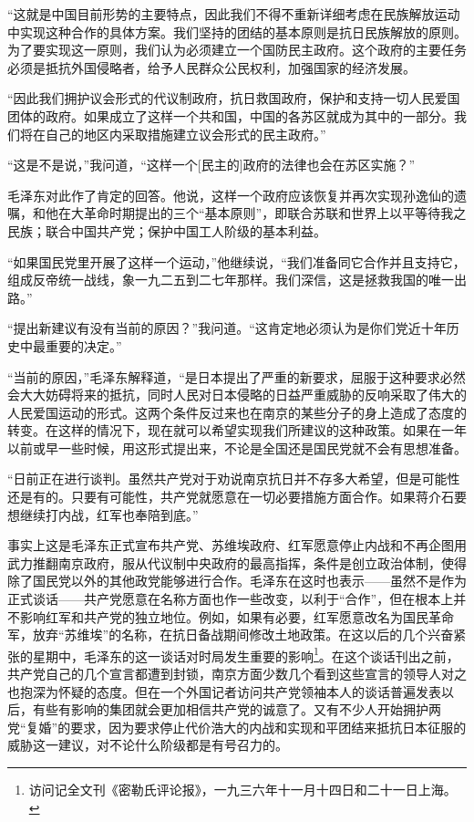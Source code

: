 \documentclass[10pt]{book}
\begin{document}
“这就是中国目前形势的主要特点，因此我们不得不重新详细考虑在民族解放运动中实现这种合作的具体方案。我们坚持的团结的基本原则是抗日民族解放的原则。为了要实现这一原则，我们认为必须建立一个国防民主政府。这个政府的主要任务必须是抵抗外国侵略者，给予人民群众公民权利，加强国家的经济发展。

“因此我们拥护议会形式的代议制政府，抗日救国政府，保护和支持一切人民爱国团体的政府。如果成立了这样一个共和国，中国的各苏区就成为其中的一部分。我们将在自己的地区内采取措施建立议会形式的民主政府。”

“这是不是说，”我问道，“这样一个[民主的]政府的法律也会在苏区实施？”

毛泽东对此作了肯定的回答。他说，这样一个政府应该恢复并再次实现孙逸仙的遗嘱，和他在大革命时期提出的三个“基本原则”，即联合苏联和世界上以平等待我之民族；联合中国共产党；保护中国工人阶级的基本利益。

“如果国民党里开展了这样一个运动，”他继续说，“我们准备同它合作并且支持它，组成反帝统一战线，象一九二五到二七年那样。我们深信，这是拯救我国的唯一出路。”

“提出新建议有没有当前的原因？”我问道。“这肯定地必须认为是你们党近十年历史中最重要的决定。”

“当前的原因，”毛泽东解释道，“是日本提出了严重的新要求，屈服于这种要求必然会大大妨碍将来的抵抗，同时人民对日本侵略的日益严重威胁的反响采取了伟大的人民爱国运动的形式。这两个条件反过来也在南京的某些分子的身上造成了态度的转变。在这样的情况下，现在就可以希望实现我们所建议的这种政策。如果在一年以前或早一些时候，用这形式提出来，不论是全国还是国民党就不会有思想准备。

“日前正在进行谈判。虽然共产党对于劝说南京抗日并不存多大希望，但是可能性还是有的。只要有可能性，共产党就愿意在一切必要措施方面合作。如果蒋介石要想继续打内战，红军也奉陪到底。”

事实上这是毛泽东正式宣布共产党、苏维埃政府、红军愿意停止内战和不再企图用武力推翻南京政府，服从代议制中央政府的最高指挥，条件是创立政治体制，使得除了国民党以外的其他政党能够进行合作。毛泽东在这时也表示——虽然不是作为正式谈话——共产党愿意在名称方面也作一些改变，以利于“合作”，但在根本上并不影响红军和共产党的独立地位。例如，如果有必要，红军愿意改名为国民革命军，放弃“苏维埃”的名称，在抗日备战期间修改土地政策。在这以后的几个兴奋紧张的星期中，毛泽东的这一谈话对时局发生重要的影响\footnote{访问记全文刊《密勒氏评论报》，一九三六年十一月十四日和二十一日上海。}。在这个谈话刊出之前，共产党自己的几个宣言都遭到封锁，南京方面少数几个看到这些宣言的领导人对之也抱深为怀疑的态度。但在一个外国记者访问共产党领袖本人的谈话普遍发表以后，有些有影响的集团就会更加相信共产党的诚意了。又有不少人开始拥护两党“复婚”的要求，因为要求停止代价浩大的内战和实现和平团结来抵抗日本征服的威胁这一建议，对不论什么阶级都是有号召力的。
\end{document}
